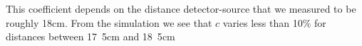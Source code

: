 \documentclass[main.tex]{subfiles}
\begin{document}
This coefficient depends on the distance detector-source that we measured to be roughly \si{18}{cm}. From the simulation we see that $c$ varies less than 10\% for distances between \si{17.5}{cm} and \si{18.5}{cm}

\begin{figure}[H]
    \centering
     \quad
    \caption{}
    \label{fig:sim}
\end{figure}
\end{document}

